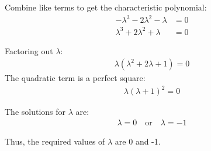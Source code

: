 \documentclass[journal]{IEEEtran}
\begin{document}
Combine like terms to get the characteristic polynomial:
\begin{align}
-\lambda^3 - 2\lambda^2 - \lambda &= 0 \\
\lambda^3 + 2\lambda^2 + \lambda &= 0
\end{align}

Factoring out $\lambda$:
\begin{align}
\lambda(\lambda^2 + 2\lambda + 1) = 0
\end{align}
The quadratic term is a perfect square:
\begin{align}
\lambda(\lambda + 1)^2 = 0
\end{align}

The solutions for $\lambda$ are:
\begin{align}
\lambda = 0 \quad \text{or} \quad \lambda = -1
\end{align}

Thus, the required values of $\lambda$ are 0 and -1.

\
\end{document}

